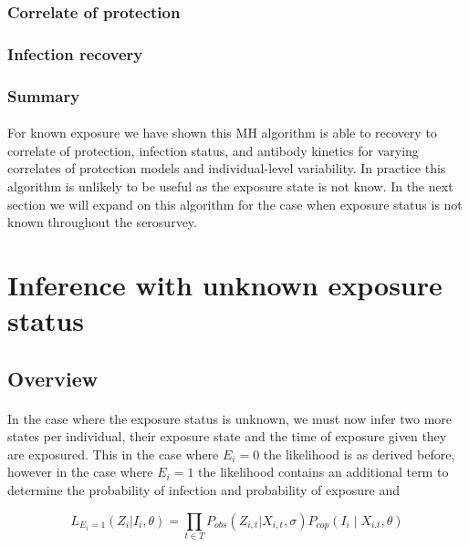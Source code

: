 \documentclass{article}
\begin{document}
\subsubsection{Correlate of protection}

\subsubsection{Infection recovery}

\subsubsection{Summary}
\paragraph{}For known exposure we have shown this MH algorithm is able to recovery to correlate of protection, infection status, and antibody kinetics for varying correlates of protection models and individual-level variability. In practice this algorithm is unlikely to be useful as the exposure state is not know. In the next section we will expand on this algorithm for the case when exposure status is not known throughout the serosurvey. 


\newpage
\section{Inference with unknown exposure status}

\subsection{Overview}

\paragraph{}In the case where the exposure status is unknown, we must now infer two more states per individual, their exposure state and the time of exposure given they are exposured. This in the case where $E_i = 0$ the likelihood is as derived before, however in the case where $E_i = 1$ the likelihood contains an additional term to determine the probability of infection and probability of exposure and 


\begin{equation}
L_{E_i = 1}(Z_{i}| I_i, \theta) = \prod_{t \in T}P_{obs}(Z_{i,t}|X_{i,t}, \sigma)P_{cop}(I_i \mid  X_{i.t}, \theta)
\end{equation}
\end{document}
